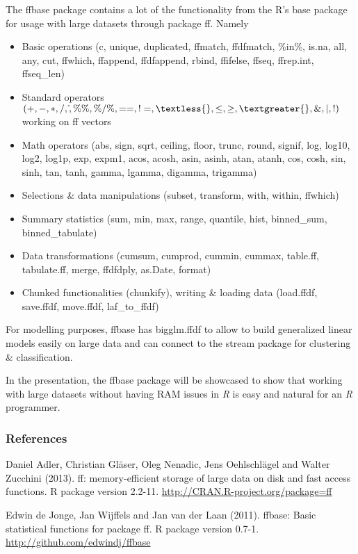 \documentclass[11pt, a4paper]{article}
\newcommand{\pkg}[1]{{\normalfont\fontseries{b}\selectfont #1}}
\let\proglang=\textit
\begin{document}
The \pkg{ffbase} package contains a lot of the functionality from the R's base package for usage with large datasets through package \pkg{ff}. 
Namely 
\begin{itemize}
  \item Basic operations (c, unique, duplicated, ffmatch, ffdfmatch, \%in\%, is.na, all, any, cut, ffwhich, ffappend, ffdfappend, rbind, ffifelse, ffseq, ffrep.int, ffseq\_len)
  \item Standard operators $(+, -, *, /, \hat{}, \%\%, \%/\%, ==, !=, \textless{}, \le, \ge, \textgreater{}, \&, |, !)$ working on ff vectors
  \item Math operators (abs, sign, sqrt, ceiling, floor, trunc, round, signif, log, log10, log2, log1p, exp, expm1, acos, acosh, asin, asinh, atan, atanh, cos, cosh, sin, sinh, tan, tanh, gamma, lgamma, digamma, trigamma)
  \item Selections \& data manipulations (subset, transform, with, within, ffwhich)
  \item Summary statistics (sum, min, max, range, quantile, hist, binned\_sum, binned\_tabulate)
  \item Data transformations (cumsum, cumprod, cummin, cummax, table.ff, tabulate.ff, merge, ffdfdply, as.Date, format)
  \item Chunked functionalities (chunkify), writing \& loading data (load.ffdf, save.ffdf, move.ffdf, laf\_to\_ffdf)
\end{itemize}
For modelling purposes, \pkg{ffbase} has bigglm.ffdf to allow to build generalized linear models easily on large data and can connect to the \pkg{stream} package for clustering \& classification.

In the presentation, the \pkg{ffbase} package will be showcased to show that working with large datasets without having RAM issues in \proglang{R} is easy and natural for an \proglang{R} programmer.

\nocite{ref1,ref2,ref3}


\subsubsection*{References}
Daniel Adler, Christian Gläser, Oleg Nenadic, Jens Oehlschl\"{a}gel and
  Walter Zucchini (2013). ff: memory-efficient storage of large data on
  disk and fast access functions. R package version 2.2-11.
  \url{http://CRAN.R-project.org/package=ff}
  
Edwin de Jonge, Jan Wijffels and Jan van der Laan (2011). ffbase:
  Basic statistical functions for package ff. R package version 0.7-1.
  \url{http://github.com/edwindj/ffbase}
\end{document}

